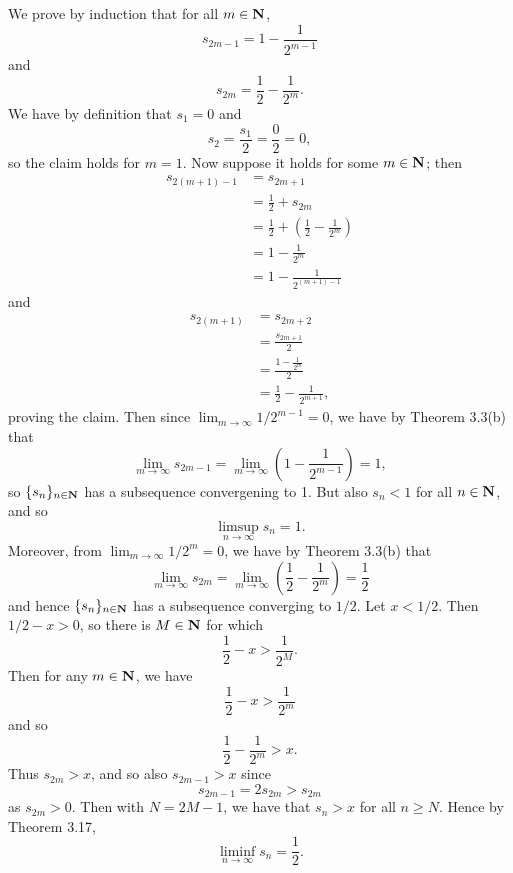 \begin{ex}
We prove by induction that for all $m \in \mathbf{N}$, \[s_{2m-1} = 1 - \frac{1}{2^{m-1}}\] and \[s_{2m} = \frac{1}{2} - \frac{1}{2^m}.\] We have by definition that $s_1 = 0$ and \[s_2 = \frac{s_1}{2} = \frac{0}{2} = 0,\] so the claim holds for $m = 1$. Now suppose it holds for some $m \in \mathbf{N}$; then
\begin{align*}
s_{2(m+1)-1} & = s_{2m+1}\\
& = \frac{1}{2} + s_{2m}\\
& = \frac{1}{2} + \left(\frac{1}{2} - \frac{1}{2^m}\right)\\
& = 1 - \frac{1}{2^m}\\
& = 1 - \frac{1}{2^{(m+1)-1}}
\end{align*}
and
\begin{align*}
s_{2(m+1)} & = s_{2m+2}\\
& = \frac{s_{2m+1}}{2}\\
& = \frac{1 - \frac{1}{2^m}}{2}\\
& = \frac{1}{2} - \frac{1}{2^{m+1}},
\end{align*}
proving the claim. Then since $\lim_{m\to\infty}1/2^{m-1} = 0$, we have by Theorem 3.3(b) that \[\lim_{m\to\infty}s_{2m-1} = \lim_{m\to\infty}\left(1 - \frac{1}{2^{m-1}}\right) = 1,\] so $\{s_n\}_{n \in \mathbf{N}}$ has a subsequence convergening to 1. But also $s_n < 1$ for all $n \in \mathbf{N}$, and so \[\limsup_{n\to\infty}s_n = 1.\] Moreover, from $\lim_{m\to\infty}1/2^m = 0$, we have by Theorem 3.3(b) that \[\lim_{m\to\infty}s_{2m} = \lim_{m\to\infty}\left(\frac{1}{2} - \frac{1}{2^m}\right) = \frac{1}{2}\] and hence $\{s_n\}_{n \in \mathbf{N}}$ has a subsequence converging to $1/2$. Let $x < 1/2$. Then $1/2 - x > 0$, so there is $M \in \mathbf{N}$ for which \[\frac{1}{2} - x > \frac{1}{2^M}.\] Then for any $m \in \mathbf{N}$, we have \[\frac{1}{2} - x > \frac{1}{2^m}\] and so \[\frac{1}{2} - \frac{1}{2^m} > x.\] Thus $s_{2m} > x$, and so also $s_{2m-1} > x$ since \[s_{2m-1} = 2s_{2m} > s_{2m}\] as $s_{2m} > 0$. Then with $N = 2M - 1$, we have that $s_n > x$ for all $n \geq N$. Hence by Theorem 3.17, \[\liminf_{n\to\infty}s_n = \frac{1}{2}.\]
\end{ex}

